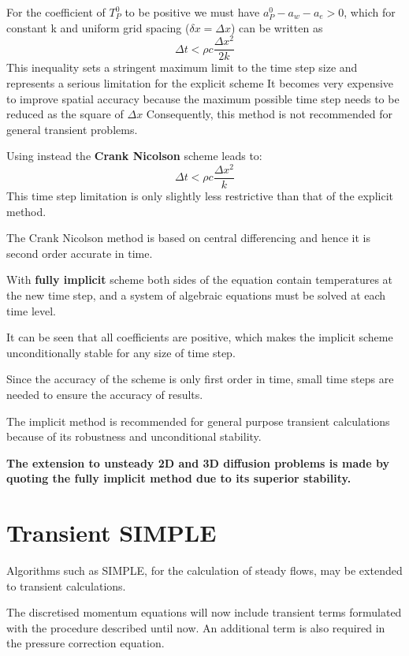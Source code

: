 \documentclass[a4paper, 15pt]{article}
\begin{document}
For
the coefficient of $T_P^0$ to be positive we must have $a_P^0-a_w-a_e>0$, which for
constant k and uniform grid spacing ($\delta x = \Delta x$) can be written as
\[\Delta t < \rho c\dfrac{\Delta x^2}{2k}\]
This
inequality sets a stringent maximum limit to the time step size and represents a serious limitation for
the explicit scheme
It becomes very expensive to improve spatial accuracy because the maximum possible time step needs to
be reduced as the square of $\Delta x$ Consequently, this method is not recommended for general transient problems. \newline 


Using instead the \textbf{Crank Nicolson} scheme leads to:
\[\Delta t < \rho c\dfrac{\Delta x^2}{k}\]
This
time step limitation is only slightly less restrictive than that of the explicit method. 

The
Crank Nicolson method is based on central differencing and hence it is second order accurate in
time. \newline 

With \textbf{fully implicit} scheme both
sides of the equation contain temperatures at the new time step, and a system of algebraic
equations must be solved at each time level. 

It
can be seen that all coefficients are positive, which makes the implicit scheme unconditionally
stable for any size of time step.

Since
the accuracy of the scheme is only first order in time, small time steps are needed to
ensure the accuracy of results.

The
implicit method is recommended for general purpose transient calculations because of its
robustness and unconditional stability. \newline 

\textbf{The extension to unsteady 2D and 3D diffusion problems is made by quoting the fully implicit
	method due to its superior stability.}
	
\section{Transient SIMPLE}

Algorithms such as SIMPLE, for the calculation of steady flows, may be extended to transient
calculations.

The discretised momentum equations will now include transient terms formulated with the
procedure described until now.
An additional term is also required in the pressure correction equation. \newline 
\end{document}
